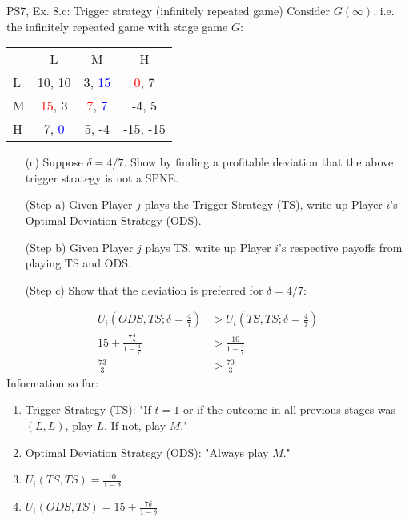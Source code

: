 \begin{frame}{PS7, Ex. 8.c: Trigger strategy (infinitely repeated game)}
    Consider $G(\infty)$, i.e. the infinitely repeated game with stage game $G$: \vspace{-6pt}
    \begin{table}
      \begin{tabular}{l|c|c|c|}
        \multicolumn{1}{c}{} & \multicolumn{1}{c}{L} & \multicolumn{1}{c}{M} & \multicolumn{1}{c}{H} \\\cline{2-4}
        L & 10, 10 & 3, \textcolor{blue}{15} & \textcolor{red}{0}, 7 \\\cline{2-4}
        M & \textcolor{red}{15}, 3 & \textcolor{red}{7}, \textcolor{blue}{7} & -4, 5 \\\cline{2-4}
        H & 7, \textcolor{blue}{0} & 5, -4 & -15, -15 \\\cline{2-4}
      \end{tabular}
    \end{table}
    \begin{itemize}
      \vspace{-4pt} \item[(c)] Suppose $\delta = 4/7$. Show by finding a profitable deviation that the above trigger strategy is not a SPNE. \vspace{-6pt}
    \end{itemize}
  \begin{multicols}{2}
    \begin{itemize}
      \item[(Step a)] Given Player $j$ plays the Trigger Strategy (TS), write up Player $i$'s Optimal Deviation Strategy (ODS).
      \item[(Step b)] Given Player $j$ plays TS, write up Player $i$'s respective payoffs from playing TS and ODS.
      \item[(Step c)] Show that the deviation is preferred for $\delta=4/7$:
    \end{itemize}
    \vspace{-8pt}
    \begin{align*}
      U_i\left(ODS,TS;\delta=\frac{4}{7}\right)&>U_i\left(TS,TS;\delta=\frac{4}{7}\right)\\
      15+\frac{7\frac{4}{7}}{1-\frac{4}{7}}&>\frac{10}{1-\frac{4}{7}}\\
      \frac{73}{3}&>\frac{70}{3}
    \end{align*}
    \vfill\null\columnbreak
    Information so far:
    \begin{enumerate}
      \item Trigger Strategy (TS): "If $t=1$ or if the outcome in all previous stages was $(L,L)$, play $L$. If not, play $M$."
      \item Optimal Deviation Strategy (ODS): "Always play $M$."
      \item $U_i(TS,TS)=\frac{10}{1-\delta}$
      \item $U_i(ODS,TS)=15+\frac{7\delta}{1-\delta}$
    \end{enumerate}
    \vfill\null
  \end{multicols}
\end{frame}



